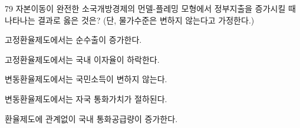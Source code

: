 \begin{question}{79}
자본이동이 완전한 소국개방경제의 먼델-플레밍 모형에서 정부지출을 증가시킬 때 나타나는 결과로 옳은 것은? (단, 물가수준은 변하지 않는다고 가정한다.)
\begin{choices}
  \item 고정환율제도에서는 순수출이 증가한다.
  \item 고정환율제도에서는 국내 이자율이 하락한다.
  \item 변동환율제도에서는 국민소득이 변하지 않는다.
  \item 변동환율제도에서는 자국 통화가치가 절하된다.
  \item 환율제도에 관계없이 국내 통화공급량이 증가한다.
\end{choices}
\end{question}
